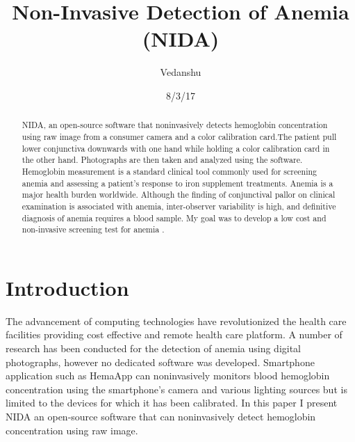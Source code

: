 \documentclass[peerreview]{IEEEtran}
\begin{document}
\title{Non-Invasive Detection of Anemia (NIDA)}



\author{Vedanshu
}
\date{8/3/17}

\maketitle
\tableofcontents
\listoftables
\printglossary[type=\acronymtype]


\IEEEpeerreviewmaketitle
\begin{abstract}
NIDA, an open-source software that noninvasively detects hemoglobin concentration using raw image from a consumer
camera and a color calibration card.The patient pull lower conjunctiva downwards with one hand while holding a color calibration
card in the other hand. Photographs are then taken and analyzed using the software. Hemoglobin measurement is a standard clinical tool
commonly used for screening anemia and assessing a patient’s response to iron supplement treatments. Anemia is a major health burden 
worldwide. Although the finding of conjunctival pallor on clinical examination is associated with anemia, inter-observer variability 
is high, and definitive diagnosis of anemia requires a blood sample. My goal was to develop a low cost and non-invasive screening test
for anemia .
\end{abstract}

\section{Introduction}

The advancement of computing technologies have revolutionized the health care facilities providing cost effective and 
remote health care platform. A number of research has been conducted for the detection of anemia using digital photographs,
however no dedicated software was developed\cite{suner2007non,10.1371/journal.pone.0153286}.
Smartphone application such as HemaApp can noninvasively monitors blood hemoglobin concentration using the smartphone’s camera and various lighting sources 
but is limited to the devices for which it has been calibrated\cite{Wang:2016:HNB:2971648.2971653}. In this paper I present 
NIDA an open-source software that can noninvasively detect hemoglobin concentration using raw image.
\end{document}
